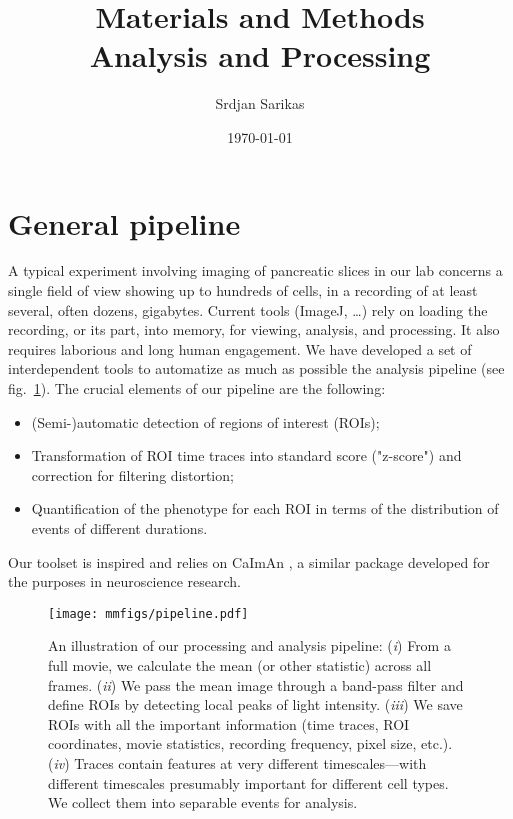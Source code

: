 \documentclass[a4paper,11pt,oneside,]{article}
\title{Materials and Methods \\ {\small Analysis and Processing}}
\author{Srdjan Sarikas}
\date{\today}
\begin{document}
\maketitle


\section{General pipeline}

A typical experiment involving imaging of pancreatic slices in our lab concerns a single field of view
showing up to hundreds of cells, in a recording of at least several, often dozens, gigabytes.
Current tools (ImageJ, \dots) rely on loading the recording, or its part, into memory, for viewing, analysis, and processing.
It also requires laborious and long human engagement.
We have developed a set of interdependent tools to automatize as much as possible the analysis pipeline (see fig.~\ref{fig:pipeline}). 
The crucial elements of our pipeline are the following:
\begin{itemize}
\item (Semi-)automatic detection of regions of interest (ROIs);
\item Transformation of ROI time traces into standard score ("z-score") and correction for filtering distortion;
\item Quantification of the phenotype for each ROI in terms of the distribution of events of different durations.
\end{itemize}

Our toolset is inspired and relies on CaImAn \cite{giovannucci2019caiman}, a similar package developed for the purposes in neuroscience research.


\begin{figure}[h]
\centering
\texttt{[image: mmfigs/pipeline.pdf]}
\caption{
\label{fig:pipeline}
An illustration of our processing and analysis pipeline:
({\it i})  From a full movie, we calculate the mean (or other statistic) across all frames.
({\it ii}) We pass the mean image through a band-pass filter and define ROIs by detecting local peaks of light intensity.
({\it iii}) We save ROIs with all the important information (time traces, ROI coordinates, movie statistics, recording frequency, pixel size, etc.).
({\it iv}) Traces contain features at very different timescales---with different timescales presumably important for different cell types. We collect them into separable events for analysis.
}
\end{figure}
\end{document}
